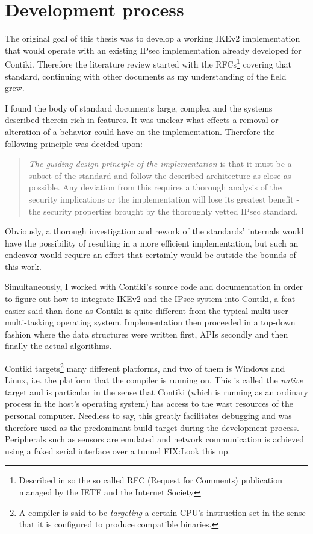 \documentclass[final,a4paper,twoside,11pt,onecolumn]{report}
\begin{document}

\section{Development process}
The original goal of this thesis was to develop a working IKEv2 implementation that would operate with an existing IPsec implementation already developed for Contiki. Therefore the literature review started with the RFCs\footnote{Described in so the so called RFC (Request for Comments) publication managed by the IETF and the Internet Society} covering that standard, continuing with other documents as my understanding of the field grew.


I found the body of standard documents large, complex and the systems described therein rich in features. It was unclear what effects a removal or alteration of a behavior could have on the implementation. Therefore the following principle was decided upon:

\begin{quotation}
\emph{The guiding design principle of the implementation} is that it must be a subset of the standard and follow the described architecture as close as possible. Any deviation from this requires a thorough analysis of the security implications or the implementation will lose its greatest benefit - the security properties brought by the thoroughly vetted IPsec standard.
\end{quotation}

Obviously, a thorough investigation and rework of the standards' internals would have the possibility of resulting in a more efficient implementation, but such an endeavor would require an effort that certainly would be outside the bounds of this work. 

Simultaneously, I worked with Contiki's source code and documentation in order to figure out how to integrate IKEv2 and the IPsec system into Contiki, a feat easier said than done as Contiki is quite different from the typical multi-user multi-tasking operating system. Implementation then proceeded in a top-down fashion where the data structures were written first, APIs secondly and then finally the actual algorithms.

Contiki targets\footnote{A compiler is said to be \emph{targeting} a certain CPU's instruction set in the sense that it is configured to produce compatible binaries.} many different platforms, and two of them is Windows and Linux, i.e. the platform that the compiler is running on. This is called the \emph{native} target and is particular in the sense that Contiki (which is running as an ordinary process in the host's operating system) has access to the wast resources of the personal computer. Needless to say, this greatly facilitates debugging and was therefore used as the predominant build target during the development process. Peripherals such as sensors are emulated and network communication is achieved using a faked serial interface over a tunnel FIX:Look this up. 
\end{document}

